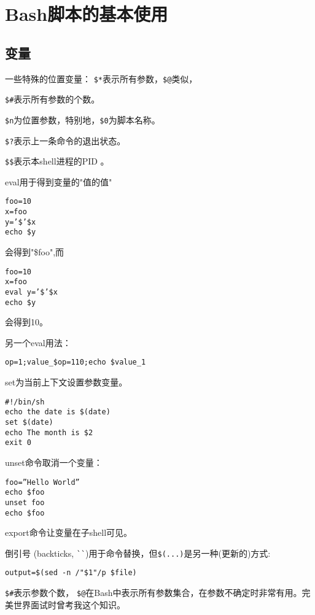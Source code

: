 \section{Bash脚本的基本使用}

\subsection{变量}

一些特殊的位置变量：
\verb|$*|表示所有参数，\verb|$@|类似，

\verb|$#|表示所有参数的个数。

\verb|$n|为位置参数，特别地，\verb|$0|为脚本名称。

\verb|$?|表示上一条命令的退出状态。

\verb|$$|表示本shell进程的PID 
。






eval用于得到变量的"值的值"
\begin{verbatim}
foo=10
x=foo
y=’$’$x
echo $y
\end{verbatim}
会得到"\$foo",而
\begin{verbatim}
foo=10
x=foo
eval y=’$’$x
echo $y
\end{verbatim}
会得到10。

另一个eval用法：
\begin{verbatim}
op=1;value_$op=110;echo $value_1
\end{verbatim}



set为当前上下文设置参数变量。

\begin{verbatim}
#!/bin/sh
echo the date is $(date)
set $(date)
echo The month is $2
exit 0
\end{verbatim}

unset命令取消一个变量：
\begin{verbatim}
foo=”Hello World”
echo $foo
unset foo
echo $foo
\end{verbatim}

export命令让变量在子shell可见。

倒引号 (backticks, \verb|``|)用于命令替换，但\verb|$(...)|是另一种(更新的)方式:
\begin{verbatim}
output=$(sed -n /"$1"/p $file)
\end{verbatim}

\verb|$#|表示参数个数，
\verb|$@|在Bash中表示所有参数集合，在参数不确定时非常有用。完美世界面试时曾考我这个知识。


